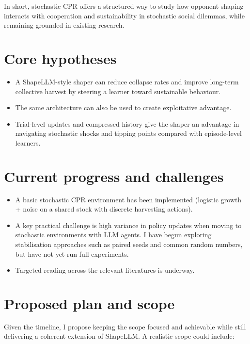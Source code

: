 \documentclass[11pt,a4paper]{article}
\begin{document}
In short, stochastic CPR offers a structured way to study how opponent shaping interacts with cooperation and sustainability in stochastic social dilemmas, while remaining grounded in existing research.

\section{Core hypotheses}

\begin{itemize}[leftmargin=*, itemsep=0.35em]
  \item A ShapeLLM-style shaper can reduce collapse rates and improve long-term collective harvest by steering a learner toward sustainable behaviour.
  \item The same architecture can also be used to create exploitative advantage.
  \item Trial-level updates and compressed history give the shaper an advantage in navigating stochastic shocks and tipping points compared with episode-level learners.
\end{itemize}

\section{Current progress and challenges}

\begin{itemize}[leftmargin=*, itemsep=0.35em]
  \item A basic stochastic CPR environment has been implemented (logistic growth + noise on a shared stock with discrete harvesting actions).
  \item A key practical challenge is high variance in policy updates when moving to stochastic environments with LLM agents. I have begun exploring stabilisation approaches such as paired seeds and common random numbers, but have not yet run full experiments.
  \item Targeted reading across the relevant literatures is underway.
\end{itemize}

\section{Proposed plan and scope}

Given the timeline, I propose keeping the scope focused and achievable while still delivering a coherent extension of ShapeLLM. A realistic scope could include:
\end{document}
